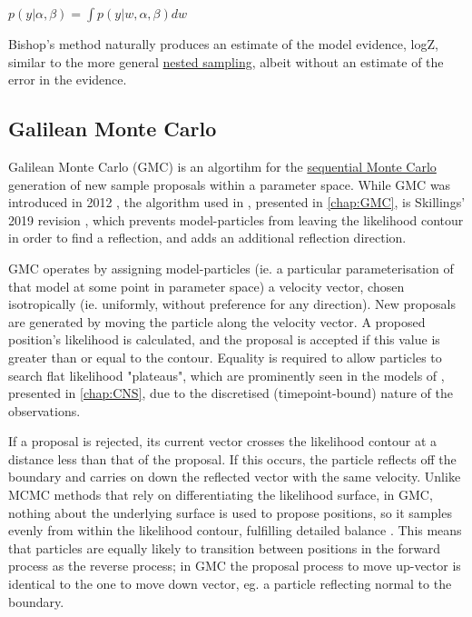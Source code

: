 \documentclass{ut-thesis}
\begin{document}
\begin{NoHyper}
$p(y|\alpha,\beta) = \int p(y|w,\alpha,\beta)dw$

Bishop's method naturally produces an estimate of the model evidence, logZ, similar to the more general \hyperref[ssec:nested]{nested sampling}, albeit without an estimate of the error in the evidence.

\subsection{Galilean Monte Carlo}
\label{ssec:GMC}
Galilean Monte Carlo (GMC) is an algortihm for the \hyperref[ssec:MonteCarlo]{sequential Monte Carlo} generation of new sample proposals within a parameter space. While GMC was introduced in 2012 \cite{Skilling2012}, the algorithm used in , presented in \autoref{chap:GMC}, is Skillings' 2019 revision \cite{Skilling2019}, which prevents model-particles from leaving the likelihood contour in order to find a reflection, and adds an additional reflection direction. 

GMC operates by assigning model-particles (ie. a particular parameterisation of that model at some point in parameter space) a velocity vector, chosen isotropically (ie. uniformly, without preference for any direction). New proposals are generated by moving the particle along the velocity vector. A proposed position's likelihood is calculated, and the proposal is accepted if this value is greater than or equal to the contour. Equality is required to allow particles to search flat likelihood "plateaus", which are prominently seen in the models of , presented in \autoref{chap:CNS}, due to the discretised (timepoint-bound) nature of the observations.

If a proposal is rejected, its current vector crosses the likelihood contour at a distance less than that of the proposal. If this occurs, the particle reflects off the boundary and carries on down the reflected vector with the same velocity. Unlike MCMC methods that rely on differentiating the likelihood surface, in GMC, nothing about the underlying surface is used to propose positions, so it samples evenly from within the likelihood contour, fulfilling detailed balance \cite{Skilling2012}. This means that particles are equally likely to transition between positions in the forward process as the reverse process; in GMC the proposal process to move up-vector is identical to the one to move down vector, eg. a particle reflecting normal to the boundary.


\end{NoHyper}
\end{document}
